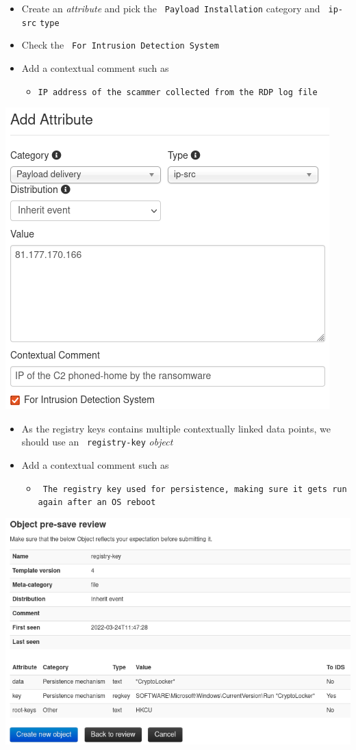\begin{frame}
    \begin{itemize}
        \item Create an \textit{attribute} and pick the \texttt{\color{black} Payload Installation} category and \texttt{\color{black} ip-src}  \texttt{type}
        \item Check the \texttt{\color{black} For Intrusion Detection System}
        \item Add a contextual comment such as
        \begin{itemize}
            \item \texttt{IP address of the scammer collected from the RDP log file}
        \end{itemize}
    \end{itemize}
    \begin{center}
        \includegraphics[width=0.42\linewidth]{pictures/case2/attribute-ip.png}
    \end{center}
\end{frame}

\begin{frame}
    \begin{itemize}
        \item As the registry keys contains multiple contextually linked data points, we should use an \texttt{\color{black} registry-key} \textit{object}
        \item Add a contextual comment such as
        \begin{itemize}
            \item \texttt{\color{black} The registry key used for persistence, making sure it gets run again after an OS reboot}
        \end{itemize}
    \end{itemize}
    \begin{center}
        \includegraphics[width=0.61\linewidth]{pictures/case2/object-registry-persistence.png}
    \end{center}
\end{frame}

